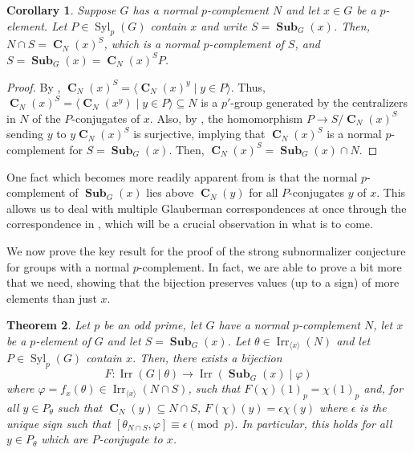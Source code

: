 \documentclass[12pt]{amsart}
\DeclareMathOperator{\CB}{\mathbf{C}}
\DeclareMathOperator{\Syl}{Syl}
\DeclareMathOperator{\Sub}{\mathbf{Sub}}
\DeclareMathOperator{\Irr}{Irr}
\theoremstyle{remark}
\theoremstyle{definition}
\theoremstyle{plain}
\newtheorem{thm}{Theorem}[section]
\newtheorem{cor}[thm]{Corollary}
\theoremstyle{definition}
\numberwithin{equation}{section}
\begin{document}
\begin{cor}
	\label{complementSubnormalizerNormalComplement}
	Suppose $G$ has a normal $p$-complement $N$ and let $x \in G$ be a $p$-element. Let $P \in \Syl_p(G)$ contain $x$ and write $S = \Sub_G(x)$. Then, $N \cap S = \CB_N(x)^S$, which is a normal $p$-complement of $S$, and $S = \Sub_G(x) = \CB_N(x)^SP$.
\end{cor}

\begin{proof}
	By , $\CB_N(x)^S = \langle \CB_N(x)^y \mid y \in P \rangle$. Thus, $\CB_N(x)^S = \langle \CB_N(x^y) \mid y \in P \rangle \subseteq N$ is a $p'$-group generated by the centralizers in $N$ of the $P$-conjugates of $x$. Also, by , the homomorphism $P \to S/\CB_N(x)^S$ sending $y$ to $y\CB_N(x)^S$ is surjective, implying that $\CB_N(x)^S$ is a normal $p$-complement for $S = \Sub_G(x)$. Then, $\CB_N(x)^S = \Sub_G(x) \cap N$.
\end{proof}

One fact which becomes more readily apparent from  is that the normal $p$-complement of $\Sub_G(x)$ lies above $\CB_N(y)$ for all $P$-conjugates $y$ of $x$. This allows us to deal with multiple Glauberman correspondences at once through the correspondence in , which will be a crucial observation in what is to come.

We now prove the key result for the proof of the strong subnormalizer conjecture for groups with a normal $p$-complement. In fact, we are able to prove a bit more that we need, showing that the bijection preserves values (up to a sign) of more elements than just $x$.

\begin{thm}
	\label{normalPComplement}
	Let $p$ be an odd prime, let $G$ have a normal $p$-complement $N$, let $x$ be a $p$-element of $G$ and let $S = \Sub_G(x)$. Let $\theta \in \Irr_{\langle x \rangle}(N)$ and let $P \in \Syl_p(G)$ contain $x$. Then, there exists a bijection $$F: \Irr(G \mid \theta) \to \Irr(\Sub_G(x) \mid \varphi)$$ where $\varphi = f_x(\theta) \in \Irr_{\langle x \rangle}(N \cap S)$, such that $F(\chi)(1)_p = \chi(1)_p$ and, for all $y \in P_\theta$ such that $\CB_N(y) \subseteq N \cap S$, $F(\chi)(y) = \epsilon \chi(y)$ where $\epsilon$ is the unique sign such that $[\theta_{N \cap S}, \varphi] \equiv \epsilon \pmod{p}$. In particular, this holds for all $y \in P_{\theta}$ which are $P$-conjugate to $x$.
\end{thm}
\end{document}
